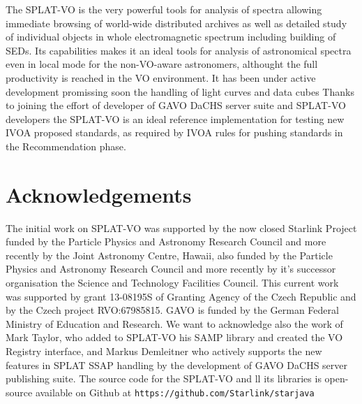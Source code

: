 \documentclass[final,authoryear,5p,times,twocolumn]{elsarticle}
\begin{document}
The SPLAT-VO is the very powerful tools for analysis of spectra allowing
immediate browsing of world-wide distributed archives as well as detailed
study of individual objects in whole electromagnetic spectrum including
building of SEDs. Its capabilities makes it an ideal tools for analysis of
astronomical spectra even in local mode for the non-VO-aware astronomers,
althought the full productivity is reached in the VO environment.  It has been
under active development promissing soon the handling of light curves and data
cubes Thanks to joining the effort of developer of GAVO DaCHS
server suite and SPLAT-VO developers the SPLAT-VO is an ideal reference
implementation for testing new IVOA proposed standards, as required by IVOA
rules for pushing standards in the Recommendation phase.






\section{Acknowledgements} The initial work on SPLAT-VO  was supported by the
now closed Starlink Project funded by the Particle Physics and Astronomy
Research Council and more recently by the Joint Astronomy Centre, Hawaii, also
funded by the Particle Physics and Astronomy Research Council and more
recently by it's successor organisation the Science and Technology Facilities
Council.  This current work  was supported by grant 13-08195S of Granting
Agency of the Czech Republic and  by the Czech project RVO:67985815.  GAVO is
funded by the German Federal Ministry of Education and Research.  We want to
acknowledge also the work of Mark Taylor, who added to SPLAT-VO his SAMP
library and created the VO Registry interface, and Markus Demleitner who
actively supports the new features in SPLAT SSAP handling by the development
of GAVO DaCHS server publishing suite.  The source code for the SPLAT-VO and
ll its libraries is open-source available on Github at
{\tt https://github.com/Starlink/starjava}



\end{document}
